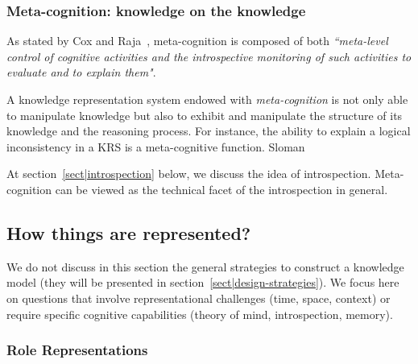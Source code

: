 \subsubsection{Meta-cognition: knowledge on the knowledge}

As stated by Cox and Raja~\cite{Cox2007}, meta-cognition is composed of both
\emph{``meta-level control of cognitive activities and the introspective
monitoring of such activities to evaluate and to explain them"}.

A knowledge representation system endowed with \emph{meta-cognition} is not
only able to manipulate knowledge but also to exhibit and manipulate the
structure of its knowledge and the reasoning process. For instance, the ability
to explain a logical inconsistency in a KRS is a meta-cognitive function.
Sloman~\cite{Sloman2011} 

At section~\ref{sect|introspection} below, we discuss the idea of
introspection.  Meta-cognition can be viewed as the technical facet of the
introspection in general.


\subsection{How things are represented?}
\label{sect|higher-level-domain-representation}

We do not discuss in this section the general strategies to construct a
knowledge model (they will be presented in
section~\ref{sect|design-strategies}). We focus here on questions that involve
representational challenges (time, space, context) or require specific
cognitive capabilities (theory of mind, introspection, memory).

\begin{scriptsize}
\begin{center}
\end{center}
\end{scriptsize}

\subsubsection{Role Representations}

